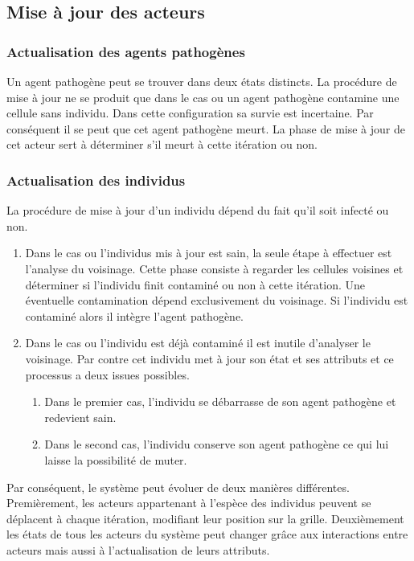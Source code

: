 \subsection{Mise à jour des acteurs}

\subsubsection{Actualisation des agents pathogènes}

Un agent pathogène peut se trouver dans deux états distincts. La procédure de mise à jour ne se produit que dans le cas ou un agent pathogène contamine une cellule sans individu. Dans cette configuration sa survie est incertaine. Par conséquent il se peut que cet agent pathogène meurt. La phase de mise à jour de cet acteur sert à déterminer s'il meurt à cette itération ou non.

\subsubsection{Actualisation des individus}

La procédure de mise à jour d'un individu dépend du fait qu'il soit infecté ou non.
\begin{enumerate}
	\item Dans le cas ou l'individus mis à jour est sain, la seule étape à effectuer est l'analyse du voisinage. Cette phase consiste à regarder les cellules voisines et déterminer si l'individu finit contaminé ou non à cette itération. Une éventuelle contamination dépend exclusivement du voisinage. Si l'individu est contaminé alors il intègre l'agent pathogène.
	\item Dans le cas ou l'individu est déjà contaminé il est inutile d'analyser le voisinage. Par contre cet individu met à jour son état et ses attributs et ce processus a deux issues possibles.
	\begin{enumerate}
		\item Dans le premier cas, l'individu se débarrasse de son agent pathogène et redevient sain.
		\item Dans le second cas, l'individu conserve son agent pathogène ce qui lui laisse la possibilité de muter.
	\end{enumerate} 
\end{enumerate}

Par conséquent, le système peut évoluer de deux manières différentes. Premièrement, les acteurs appartenant à l'espèce des individus peuvent se déplacent à chaque itération, modifiant leur position sur la grille. Deuxièmement les états de tous les acteurs du système peut changer grâce aux interactions entre acteurs mais aussi à l'actualisation de leurs attributs.\\

